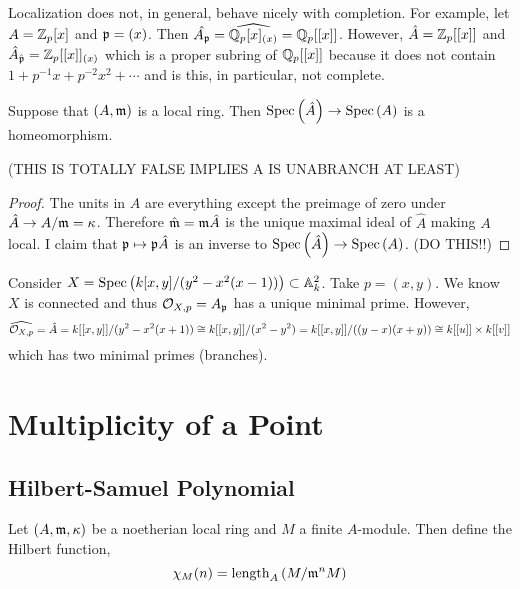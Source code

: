 \documentclass[12pt]{article}
\begin{document}
\begin{rmk}
Localization does not, in general, behave nicely with completion. For example, let $A = \mathbb{Z}_p[x]$ and $\mathfrak{p} = (x)$. Then $\hat{A_{\mathfrak{p}}} = \widehat{\mathbb{Q}_p[x]_{(x)}} = \mathbb{Q}_p[[x]]$. However, $\hat{A} = \mathbb{Z}_p[[x]]$ and $\hat{A}_{\hat{\mathfrak{p}}} = \mathbb{Z}_p[[x]]_{(x)}$ which is a proper subring of $\mathbb{Q}_p[[x]]$ because it does not contain $1 + p^{-1} x + p^{-2} x^2 + \cdots$ and is this, in particular, not complete.
\end{rmk}

\begin{lemma}
Suppose that $(A, \mathfrak{m})$ is a local ring. Then $\mathrm{Spec}\left( \hat{A} \right) \to \mathrm{Spec}\left( A \right)$ is a homeomorphism.
\end{lemma}

(THIS IS TOTALLY FALSE IMPLIES A IS UNABRANCH AT LEAST)

\begin{proof}
The units in $\hat{A}$ are everything except the preimage of zero under $\hat{A} \to A / \mathfrak{m} = \kappa$. Therefore $\hat{\mathfrak{m}} = \mathfrak{m} \hat{A}$ is the unique maximal ideal of $\hat{A}$ making $A$ local. I claim that $\mathfrak{p} \mapsto \mathfrak{p} \hat{A}$ is an inverse to $\mathrm{Spec}\left( \hat{A} \right) \to \mathrm{Spec}\left( A \right)$. (DO THIS!!)
\end{proof}

\begin{example}
Consider $X = \mathrm{Spec}\left( k[x, y]/(y^2 - x^2(x-1)) \right) \subset \mathbb{A}^2_k$. Take $p = (x, y)$. We know $X$ is connected and thus $\mathcal{O}_{X, p} = A_{\mathfrak{p}}$ has a unique minimal prime. However, 
\[ \widehat{\mathcal{O}_{X, p}} = \hat{A} = k[[x, y]] / (y^2 - x^2(x + 1)) \cong k[[x, y]]/(x^2 - y^2) = k[[x, y]]/((y - x)(x + y)) \cong k[[u]] \times k[[v]] \]
which has two minimal primes (branches). 
\end{example}


\section{Multiplicity of a Point}

\subsection{Hilbert-Samuel Polynomial}

\begin{defn}
Let $(A, \mathfrak{m}, \kappa)$ be a noetherian local ring and $M$ a finite $A$-module. Then define the Hilbert function,
\[ \chi_M(n) = \mathrm{length}_{A}\left( M/\mathfrak{m}^n M \right) \]
\end{defn}
\end{document}
